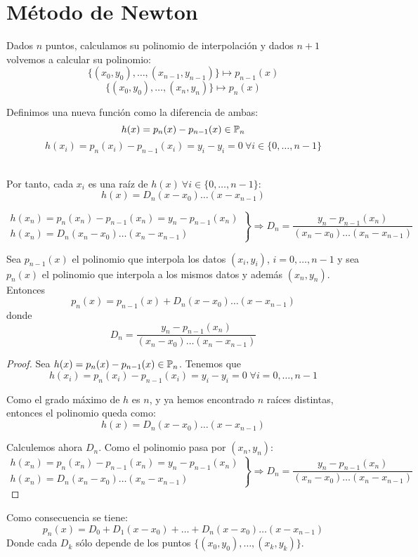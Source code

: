 \section{Método de Newton}
\noindent
Dados $n$ puntos, calculamos su polinomio de interpolación y dados $n+1$ volvemos a calcular su polinomio:
$$\{(x_0,y_0),\ldots, (x_{n-1},y_{n-1})\} \mapsto p_{n-1}(x)$$
$$\{(x_0,y_0),\ldots, (x_n,y_n)\} \mapsto p_n(x)$$

\noindent
Definimos una nueva función como la diferencia de ambas:
$$h(x)=p_n(x)-p_{n-1}(x) \in \mathbb{P}_n$$
$$h(x_i) = p_n(x_i) - p_{n-1}(x_i) = y_i - y_i = 0 \ \forall i \in \{0, \ldots, n-1\}$$

\ \\ \noindent
Por tanto, cada $x_i$ es una raíz de $h(x) \ \forall i \in \{0, \ldots, n-1\}$:
$$h(x)=D_n(x-x_0)\ldots (x-x_{n-1})$$

$$\left.\begin{array}{l}
        h(x_n)=p_n(x_n) - p_{n-1}(x_n) = y_n - p_{n-1}(x_n) \\
        h(x_n)=D_n(x_n-x_0) \ldots (x_n - x_{n-1})
    \end{array}\right\} \Rightarrow
    D_n = \dfrac{y_n - p_{n-1}(x_n)}{(x_n-x_0)\ldots(x_n-x_{n-1})}$$

\begin{teo}
    Sea $p_{n-1}(x)$ el polinomio que interpola los datos $(x_i, y_i)$, $i = 0, \dots, n-1$ y  sea $p_n(x)$ el polinomio que interpola a los mismos datos y además $(x_n, y_n)$. Entonces
    $$p_{n}(x) = p_{n-1}(x) + D_n(x-x_0)\dots(x-x_{n-1})$$
    donde
    $$D_n = \frac{y_n - p_{n-1}(x_n)}{(x_n-x_0)\dots(x_n-x_{n-1})}$$
\end{teo}
\begin{proof}
    Sea $h(x) = p_n(x) - p_{n-1}(x) \in \mathbb{P}_n$. Tenemos que $$h(x_i)=p_n(x_i) - p_{n-1}(x_i) = y_i - y_i = 0 \;\forall i=0, \dots, n-1$$

    Como el grado máximo de $h$ es $n$, y ya hemos encontrado $n$ raíces distintas, entonces el polinomio queda como:
    $$h(x)=D_n(x-x_0)\dots(x-x_{n-1})$$

    Calculemos ahora $D_n$. Como el polinomio pasa por $(x_n, y_n)$:
    \begin{equation*}
        \left.\begin{array}{l}
            h(x_n) = p_n(x_n) - p_{n-1}(x_n) = y_n - p_{n-1}(x_n)  \\
            h(x_n) = D_n(x_n-x_0)\dots(x_n-x_{n-1}) 
        \end{array}\right\} \Longrightarrow D_n = \frac{y_n - p_{n-1}(x_n)}{(x_n-x_0)\dots(x_n-x_{n-1})}
    \end{equation*}
\end{proof}
\begin{coro}
    Como consecuencia se tiene:
    $$p_n(x)=D_0 + D_1(x-x_0) + \ldots + D_n(x-x_0)\ldots (x-x_{n-1})$$
    Donde cada $D_k$ sólo depende de los puntos $\{(x_0,y_0),\ldots, (x_k,y_k)\}$.
\end{coro}

